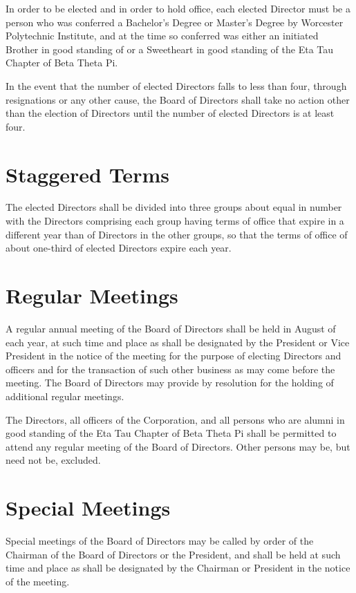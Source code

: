 In order to be elected and in order to hold office, each elected Director must
be a person who was conferred a Bachelor's Degree or Master's Degree by
Worcester Polytechnic Institute, and at the time so conferred was either an
initiated Brother in good standing of or a Sweetheart in good standing of the
Eta Tau Chapter of Beta Theta Pi.

In the event that the number of elected Directors falls to less than four,
through resignations or any other cause, the Board of Directors shall take no
action other than the election of Directors until the number of elected
Directors is at least four.

\section{Staggered Terms}

The elected Directors shall be divided into three groups about equal in number
with the Directors comprising each group having terms of office that expire in a
different year than of Directors in the other groups, so that the terms of
office of about one-third of elected Directors expire each year.

\section{Regular Meetings}

A regular annual meeting of the Board of Directors shall be held in August of
each year, at such time and place as shall be designated by the President or
Vice President in the notice of the meeting for the purpose of electing
Directors and officers and for the transaction of such other business as may
come before the meeting.  The Board of Directors may provide by resolution for
the holding of additional regular meetings.

The Directors, all officers of the Corporation, and all persons who are alumni
in good standing of the Eta Tau Chapter of Beta Theta Pi shall be
permitted to attend any regular meeting of the Board of Directors.  Other
persons may be, but need not be, excluded.

\section{Special Meetings}

Special meetings of the Board of Directors may be called by order of the
Chairman of the Board of Directors or the President, and shall be held at such
time and place as shall be designated by the Chairman or President in the notice
of the meeting.

